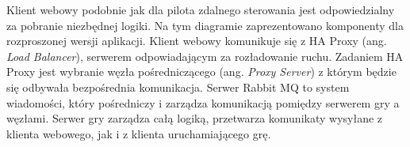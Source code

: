 \par

Klient webowy podobnie jak dla pilota zdalnego sterowania jest odpowiedzialny za pobranie niezbędnej logiki. Na tym diagramie zaprezentowano komponenty dla rozproszonej wersji aplikacji. Klient webowy komunikuje się z HA Proxy (ang. \emph{Load Balancer}), serwerem odpowiadającym za rozładowanie ruchu. Zadaniem HA Proxy jest wybranie węzła pośredniczącego (ang. \emph{Proxy Server}) z którym będzie się odbywała bezpośrednia komunikacja. Serwer Rabbit MQ to system wiadomości, który pośredniczy i zarządza komunikacją pomiędzy serwerem gry a węzłami. Serwer gry zarządza całą logiką, przetwarza komunikaty wysyłane z klienta webowego, jak i z klienta uruchamiającego grę. 
